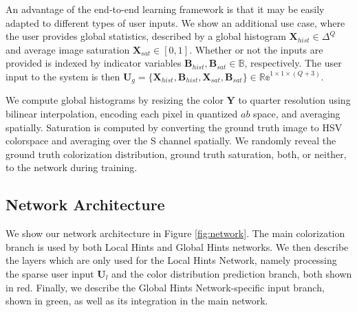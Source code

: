 \documentclass[acmtog,authorversion]{acmart}
\begin{document}
An advantage of the end-to-end learning framework is that it may be easily adapted to different types of user inputs. We show an additional use case, where the user provides global statistics, described by a global histogram $\mathbf{X}_{hist}\in \Delta^{Q}$ and average image saturation $\mathbf{X}_{sat}\in [0,1]$. Whether or not the inputs are provided is indexed by indicator variables $\mathbf{B}_{hist},\mathbf{B}_{sat}\in \mathds{B}$, respectively. The user input to the system is then $\mathbf{U}_{g} = \{\mathbf{X}_{hist}, \mathbf{B}_{hist}, \mathbf{X}_{sat}, \mathbf{B}_{sat}\} \in \mathds{Re}^{1\times 1\times (Q+3)}$.

We compute global histograms by resizing the color $\mathbf{Y}$ to quarter resolution using bilinear interpolation, encoding each pixel in quantized $ab$ space, and averaging spatially. Saturation is computed by converting the ground truth image to HSV colorspace and averaging over the S channel spatially. We randomly reveal the ground truth colorization distribution, ground truth saturation, both, or neither, to the network during training.

\subsection{Network Architecture}
\label{sec:net-arch}

We show our network architecture in Figure \ref{fig:network}. The main colorization branch is used by both Local Hints and Global Hints networks. We then describe the layers which are only used for the Local Hints Network, namely processing the sparse user input $\mathbf{U}_l$ and the color distribution prediction branch, both shown in red. Finally, we describe the Global Hints Network-specific input branch, shown in green, as well as its integration in the main network.
\end{document}
